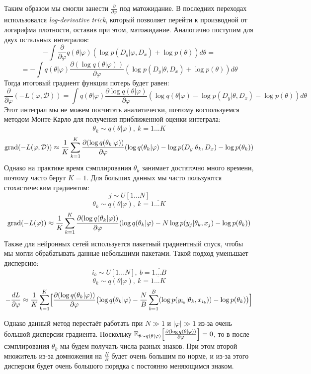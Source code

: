 Таким образом мы смогли занести $\frac{\partial}{\partial\varphi}$ под матожидание. В последних переходах использовался \textit{log-derivative trick}, который позволяет перейти к производной от логарифма плотности, оставив при этом, матожидание.
 Аналогично поступим для двух остальных интегралов:
$$-\int \frac{\partial}{\partial\varphi} q(\theta | \varphi) (\log p(D_y | \varphi, D_x) + \log p(\theta)) d\theta =$$
$$=-\int q(\theta | \varphi) \frac{\partial (\log q(\theta | \varphi))}{\partial\varphi} (\log p(D_y | \theta, D_x) + \log p(\theta)) d\theta$$
Тогда итоговый градиент функции потерь будет равен:
$$\frac{\partial}{\partial\varphi} (-L(\varphi, \mathcal{D})) = \int q(\theta | \varphi) \frac{\partial \log q(\theta | \varphi)}{\partial\varphi} (\log q(\theta | \varphi) - \log p(D_y | \theta, D_x) - \log p(\theta)) d\theta$$
Этот интеграл мы не можем посчитать аналитически, поэтому воспользуемся методом Монте-Карло для получения приближенной оценки интеграла\cite{black-box-vi}:
$$\theta_k \sim q(\theta | \varphi),\ k = \overline{1...K}$$
$$\operatorname*{grad} (-L(\varphi, \mathcal{D})) \approx \displaystyle \frac{1}{K}\sum_{k=1}^{K} \frac{\partial(\log q(\theta_k | \varphi))}{\partial\varphi} (\log q(\theta_k | \varphi) - \log p(D_y | \theta_k, D_x) - \log p(\theta_k))$$
Однако на практике время сэмплирования $\theta_k$ занимает достаточно много времени, поэтому часто берут $K=1$. Для больших данных мы часто пользуются стохастическим градиентом:
$$j \sim U[1...N]$$
$$\theta_k \sim q(\theta | \varphi),\ k = \overline{1...K}$$
$$\operatorname*{grad} (-L(\varphi)) \approx \displaystyle \frac{1}{K}\sum_{k=1}^K \frac{\partial(\log q(\theta_k | \varphi))}{\partial\varphi} (\log q(\theta_k | \varphi) - N\log p(y_j | \theta_k, x_j) - \log p(\theta_k))$$
Также для нейронных сетей используется пакетный градиентный спуск, чтобы мы могли обрабатывать данные небольшими пакетами. Такой подход уменьшает дисперсию:
$$i_b \sim U[1...N],\ b = \overline{1...B}$$
$$\theta_k \sim q(\theta | \varphi),\ k = \overline{1...K}$$
$$-\frac{dL}{\partial\varphi}\approx\frac{1}{K} \sum_{k=1}^K \Bigl[\frac{\partial(\log q(\theta_k | \varphi))}{\partial\varphi} \bigl(\log q(\theta_k | \varphi) - \frac{N}{B} \sum_{b=1}^B (\log p(y_{i_b} | \theta_k, x_{i_b})) - \log p(\theta_k)\bigr)\Bigr]$$

Однако данный метод перестаёт работать при $N \gg 1$ и $|\varphi| \gg 1$ из-за очень большой дисперсии градиента.
 Поскольку $\mathbb{E}_{\theta \sim q(\theta | \varphi)} \Bigl[\frac{\partial(\log q(\theta | \varphi))}{\partial \varphi}\Bigr] = 0$,
 то в после сэмплирования $\theta_k$ мы будем получать числа разных знаков. При этом второй множитель из-за домножения на $\frac{N}{B}$
 будет очень большим по норме, и из-за этого дисперсия будет очень большого порядка с постоянно меняющимся знаком.


